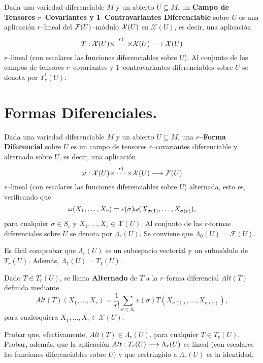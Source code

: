 \documentclass[cursovd_portada.tex]{subfiles}
\begin{document}
\begin{defi}
Dada una variedad diferenciable $M$ y un abierto $U\subseteq M$, un {\bf Campo de Tensores $r$--Covariantes y
1--Contravariantes Diferenciable} sobre $U$ es una aplicación $r$--lineal del ${\cal F}(U)$--módulo ${\cal X}(U)$ en
$\mathcal{X}(U)$, es decir, una aplicación
$$T:{\cal X}(U)\times\stackrel{r)}\cdots\times\mathcal{X}(U)\longrightarrow\mathcal{X}(U)$$
$r$--lineal (con escalares las funciones diferenciables sobre $U$). Al conjunto de los campos de tensores
$r$--covariantes y 1--contravariantes diferenciables sobre $U$ se denota por $T_r^1(U)$.
\end{defi}
\section{Formas Diferenciales.}
\begin{defi}
Dada una variedad diferenciable $M$ y un abierto $U\subseteq M$, una {\bf $r$--Forma Diferencial} sobre $U$ es un
campo de tensores $r$--covariantes diferenciable y alternado sobre $U$, es decir, una aplicación
$$\omega:{\cal X}(U)\times\stackrel{r)}\cdots\times\mathcal{X}(U)\longrightarrow\mathcal{F}(U)$$
$r$--lineal (con escalares las funciones diferenciables sobre $U$) alternada, esto es, verificando que
$$\omega(X_1,\dots ,X_r)=\varepsilon(\sigma)\omega(X_{\sigma(1)},\dots ,X_{\sigma(r)}),$$
para cualquier $\sigma\in S_r$ y $X_1,\dots ,X_r\in\mathcal{X}(U)$. Al conjunto de las $r$-formas diferenciales
sobre $U$ se denota por $\Lambda_r(U)$. Se conviene que $\Lambda_0(U)=\mathcal{F}(U)$.
\end{defi}
\begin{nota}
{\rm Es fácil comprobar que $\Lambda_r(U)$ es un subespacio vectorial y un sub\-mó\-du\-lo de $T_r(U)$. Además,
$\Lambda_1(U)=T_1(U)$. }
\end{nota}
\begin{defi}
Dado $T\in T_r(U)$, se llama {\bf Alternado} de $T$ a la $r$--forma diferencial $Alt(T)$ definida mediante
$$Alt(T)(X_1,\dots ,X_r)=\frac{1}{r!}\sum_{\sigma\in S_r}\varepsilon(\sigma)T(X_{\sigma(1)},\dots
,X_{\sigma(r)}),$$ para cualesquiera $X_1,\dots ,X_r\in\mathcal{X}(U)$.
\end{defi}
\begin{ejer}
{\rm Probar que, efectivamente, $Alt(T)\in\Lambda_r(U)$, para cualquier $T\in T_r(U)$. Probar, además, que
la aplicación $Alt:T_r(U)\longrightarrow\Lambda_r(U)$ es lineal (con escalares las funciones diferenciables sobre $U$) y que
restringido a $\Lambda_r(U)$ es la identidad.}
\end{ejer}
\end{document}
